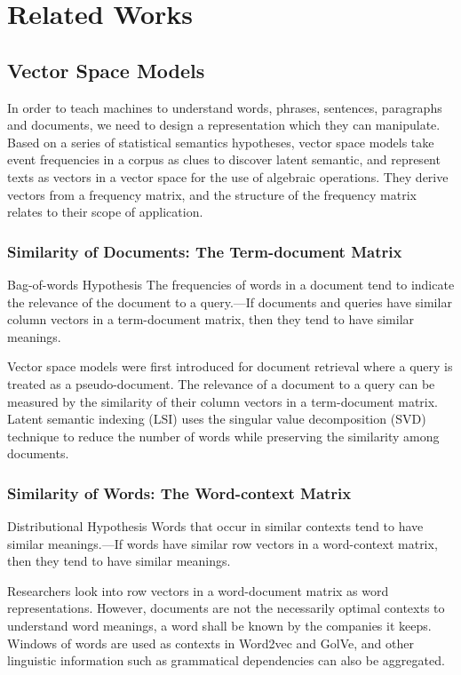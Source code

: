 \chapter{Related Works}
\section{Vector Space Models}
\par In order to teach machines to understand words, phrases, sentences, paragraphs and documents, we need to design a representation which they can manipulate. Based on a series of statistical semantics hypotheses, vector space models take event frequencies in a corpus as clues to discover latent semantic, and represent texts as vectors in a vector space for the use of algebraic operations. They derive vectors from a frequency matrix, and the structure of the frequency matrix relates to their scope of application\cite{turney2010vsm}.

\subsection{Similarity of Documents: The Term-document Matrix}
\begin{hypothesis}{Bag-of-words Hypothesis}{}
The frequencies of words in a document tend to indicate the relevance of the document to a query\cite{salton1975vsmh1}.---If documents and queries have similar column vectors in a term-document matrix, then they tend to have similar meanings.
\end{hypothesis}
\par Vector space models were first introduced for document retrieval where a query is treated as a pseudo-document\cite{salton1975vsmh1}. The relevance of a document to a query can be measured by the similarity of their column vectors in a term-document matrix. Latent semantic indexing (LSI)\cite{deerwester1990lsi} uses the singular value decomposition (SVD) technique to reduce the number of words while preserving the similarity among documents.


\subsection{Similarity of Words: The Word-context Matrix}
\begin{hypothesis}{Distributional Hypothesis}{}
Words that occur in similar contexts tend to have similar meanings\cite{harris1954vsmh2,firth1957vsmh2}.---If words have similar row vectors in a word-context matrix, then they tend to have similar meanings.
\end{hypothesis}
\par Researchers look into row vectors in a word-document matrix as word representations. However, documents are not the necessarily optimal contexts to understand word meanings, a word shall be known by the companies it keeps\cite{firth1957vsmh2}. Windows of words are used as contexts in Word2vec\cite{mikolov2013word2vec} and GolVe\cite{pennington2014glove}, and other linguistic information such as grammatical dependencies can also be aggregated\cite{lin1998vsmex2,pado2007vsmex2}.


